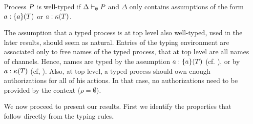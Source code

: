 \begin{definition}\label{def:well-typed_processes}
Process $P$ is well-typed if $\Delta\vdash_\emptyset P$ and $\Delta$ only contains assumptions of the form $a: \{a\}(T)$ or $a: {\mathbf{\kappa}}(T)$. 
\end{definition}
The assumption that a typed process is at top level also well-typed, used in the later results, should seem as natural. 
Entries of the typing environment are associated only to free names of the typed process, that at top level are all names of channels. Hence, names are typed by the assumption $a: \{a\}(T)$ (cf. ), or by $a: {\mathbf{\kappa}}(T)$ (cf, ). %
Also, at top-level, a typed process should own enough authorizations for all of his actions. In that case, no authorizations need to be provided by the context ($\rho=\emptyset$). %

We now proceed to present our results. First we identify the properties that follow directly from the typing rules.



